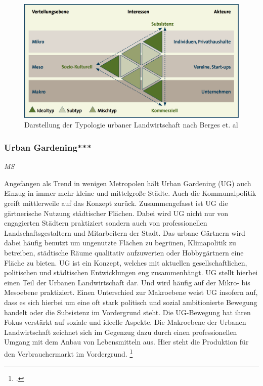 \documentclass{scrartcl}
\begin{document}
\begin{figure}[htbp]
\centering
\includegraphics[width=12cm]{image_folder/ul_typologie.png}
\caption{Darstellung der Typologie urbaner Landwirtschaft nach Berges et. al}
\label{fig:ul_typologie}
\end{figure}

\subsubsection{Urban Gardening***}\textit{MS}

Angefangen als Trend in wenigen Metropolen hält Urban Gardening (UG) auch Einzug in immer mehr kleine und mittelgroße Städte. Auch die Kommunalpolitik greift mittlerweile auf das Konzept zurück. Zusammengefasst ist UG die gärtnerische Nutzung städtischer Flächen. Dabei wird UG nicht nur von engagierten Städtern praktiziert sondern auch von professionellen Landschaftsgestaltern und Mitarbeitern der Stadt. Das urbane Gärtnern wird dabei häufig benutzt um ungenutzte Flächen zu begrünen, Klimapolitik zu betreiben, städtische Räume qualitativ aufzuwerten oder Hobbygärtnern eine Fläche zu bieten. UG ist ein Konzept, welches mit aktuellen gesellschaftlichen, politischen und städtischen Entwicklungen eng zusammenhängt.
UG stellt hierbei einen Teil der Urbanen Landwirtschaft dar. Und wird häufig auf der Mikro- bis Mesoebene praktiziert. Einen Unterschied zur Makroebene weist UG insofern auf, dass es sich hierbei um eine oft stark politisch und sozial ambitionierte Bewegung handelt oder die Subsistenz im Vordergrund steht. Die UG-Bewegung hat ihren Fokus verstärkt auf soziale und ideelle Aspekte. Die Makroebene der Urbanen Landwirtschaft zeichnet sich im Gegenzug dazu durch einen professionellen Umgang mit dem Anbau von Lebensmitteln aus. Hier steht die Produktion für den Verbrauchermarkt im Vordergrund. \footcite[S.27]{}
\end{document}
